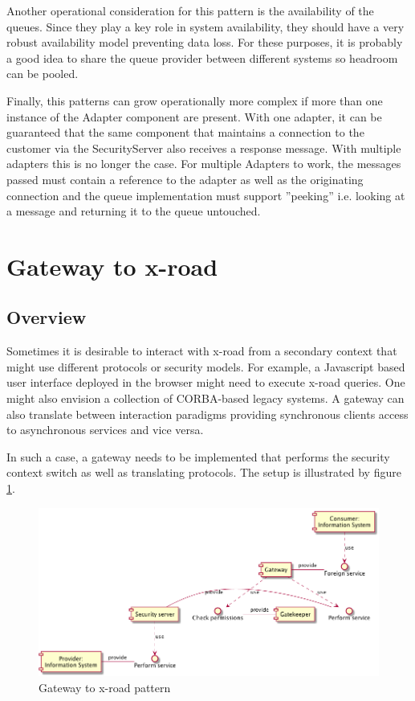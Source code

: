 \documentclass[10pt,a4paper]{article}
\begin{document}
Another operational consideration for this pattern is the availability of the queues. Since they play a key role in system availability, they should have a very robust availability model preventing data loss. For these purposes, it is probably a good idea to share the queue provider between different systems so headroom can be pooled.

Finally, this patterns can grow operationally more complex if more than one instance of the Adapter component are present. With one adapter, it can be guaranteed that the same component that maintains a connection to the customer via the SecurityServer also receives a response message. With multiple adapters this is no longer the case. For multiple Adapters to work, the messages passed must contain a reference to the adapter as well as the originating connection and the queue implementation must support ''peeking'' i.e. looking at a message and returning it to the queue untouched.
 
\section{Gateway to x-road}
\label{sec:p:8}
\subsection{Overview}
Sometimes it is desirable to interact with x-road from a secondary context that might use different protocols or security models. For example, a Javascript based user interface deployed in the browser might need to execute x-road queries. One might also envision a collection of CORBA-based legacy systems. A gateway can also translate between interaction paradigms providing synchronous clients access to asynchronous services and vice versa.

In such a case, a gateway needs to be implemented that performs the security context switch as well as translating protocols. The setup is illustrated by figure \ref{fig:p:8}. 

\begin{figure}[htp]
	\begin{center}
		\includegraphics[width=1\textwidth]{gfx/8_comp.png}
		\caption{Gateway to x-road pattern}
		\label{fig:p:8}
	\end{center}
\end{figure}
\end{document}
